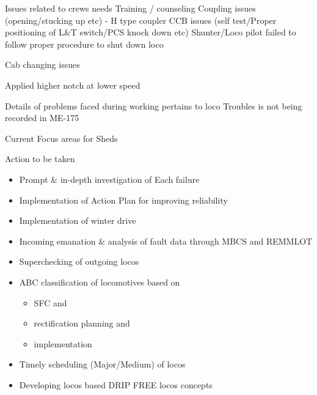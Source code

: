 \documentclass[
  ignorenonframetext,
]{beamer}
\providecommand{\tightlist}{%
  \setlength{\itemsep}{0pt}\setlength{\parskip}{0pt}}
\begin{document}
\begin{frame}{Issues related to crews needs Training / counseling}
\protect\hypertarget{issues-related-to-crews-needs-training-counseling}{}
Coupling issues (opening/stucking up etc) - H type coupler CCB issues
(self test/Proper positioning of L\&T switch/PCS knock down etc)
Shunter/Loco pilot failed to follow proper procedure to shut down loco

\begin{block}{Cab changing issues}
\protect\hypertarget{cab-changing-issues}{}

Applied higher notch at lower speed

Details of problems faced during working pertains to loco Troubles is
not being recorded in ME-175
\end{block}

\begin{block}{Current Focus areas for Sheds}
\protect\hypertarget{current-focus-areas-for-sheds}{}
\end{block}

\begin{block}{Action to be taken}
\protect\hypertarget{action-to-be-taken}{}
\begin{itemize}[<+->]
\tightlist
\item
  Prompt \& in-depth investigation of Each failure
\item
  Implementation of Action Plan for improving reliability
\item
  Implementation of winter drive
\item
  Incoming emanation \& analysis of fault data through MBCS and REMMLOT
\item
  Superchecking of outgoing locos
\item
  ABC classification of locomotives based on

  \begin{itemize}[<+->]
  \tightlist
  \item
    SFC and\\
  \item
    rectification planning and
  \item
    implementation
  \end{itemize}
\item
  Timely scheduling (Major/Medium) of locos
\item
  Developing locos based DRIP FREE locos concepts
\end{itemize}
\end{block}
\end{frame}
\end{document}
